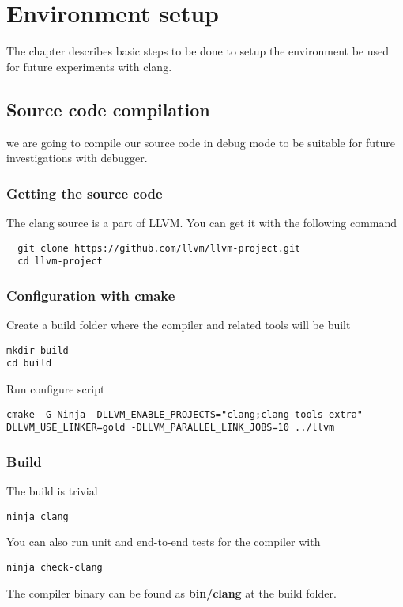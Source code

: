 \chapter{Environment setup}

The chapter describes basic steps to be done to setup the environment
be used for future experiments with clang.

\section{Source code compilation}

we are going to compile our source code in debug mode to be suitable
for future investigations with debugger.

\subsection{Getting the source code}

The clang source is a part of LLVM. You can get it with the following
command
\begin{verbatim}
  git clone https://github.com/llvm/llvm-project.git
  cd llvm-project
\end{verbatim}

\subsection{Configuration with cmake}
Create a build folder where the compiler and related tools will be
built
\begin{verbatim}
mkdir build
cd build
\end{verbatim}
Run configure script
\begin{verbatim}
cmake -G Ninja -DLLVM_ENABLE_PROJECTS="clang;clang-tools-extra" -DLLVM_USE_LINKER=gold -DLLVM_PARALLEL_LINK_JOBS=10 ../llvm
\end{verbatim}

\subsection{Build}
The build is trivial
\begin{verbatim}
ninja clang
\end{verbatim}

You can also run unit and end-to-end tests for the compiler with
\begin{verbatim}
ninja check-clang
\end{verbatim}

The compiler binary can be found as \textbf{bin/clang} at the build folder. 
